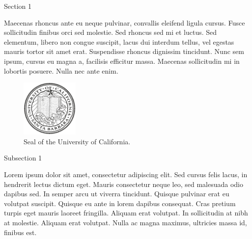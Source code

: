 \begin{section}{Section 1}

Maecenas rhoncus ante eu neque pulvinar, convallis eleifend ligula cursus. Fusce sollicitudin finibus orci sed molestie. Sed rhoncus sed mi et luctus. Sed elementum, libero non congue suscipit, lacus dui interdum tellus, vel egestas mauris tortor sit amet erat. Suspendisse rhoncus dignissim tincidunt. Nunc sem ipsum, cursus eu magna a, facilisis efficitur massa. Maecenas sollicitudin mi in lobortis posuere. Nulla nec ante enim.

\begin{figure}[t]
    \hfill\null
    \includegraphics[width=0.25\textwidth]{content/frontmatter/ucsbseal.pdf}
    \hfill\null
    \caption{Seal of the University of California.}
    \label{fig:label}
\end{figure}

\begin{subsection}{Subsection 1}

Lorem ipsum dolor sit amet, consectetur adipiscing elit. Sed cursus felis lacus, in hendrerit lectus dictum eget. Mauris consectetur neque leo, sed malesuada odio dapibus sed. In semper arcu ut viverra tincidunt. Quisque pulvinar erat eu volutpat suscipit. Quisque eu ante in lorem dapibus consequat. Cras pretium turpis eget mauris laoreet fringilla. Aliquam erat volutpat. In sollicitudin at nibh at molestie. Aliquam erat volutpat. Nulla ac magna maximus, ultricies massa id, finibus est.

\end{subsection}

\end{section}